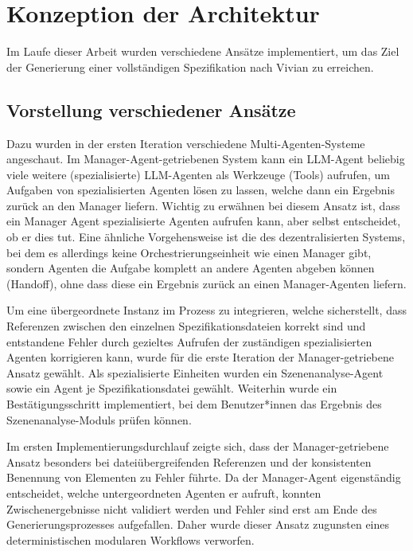 \section{Konzeption der Architektur}

Im Laufe dieser Arbeit wurden verschiedene Ansätze implementiert, um das Ziel der Generierung einer vollständigen Spezifikation nach Vivian zu erreichen.

\subsection{Vorstellung verschiedener Ansätze}

Dazu wurden in der ersten Iteration verschiedene Multi-Agenten-Systeme angeschaut. Im Manager-Agent-getriebenen System kann ein LLM-Agent beliebig viele weitere (spezialisierte) LLM-Agenten als Werkzeuge (Tools) aufrufen, um Aufgaben von spezialisierten Agenten lösen zu lassen, welche dann ein Ergebnis zurück an den Manager liefern. Wichtig zu erwähnen bei diesem Ansatz ist, dass ein Manager Agent spezialisierte Agenten aufrufen kann, aber selbst entscheidet, ob er dies tut. Eine ähnliche Vorgehensweise ist die des dezentralisierten Systems, bei dem es allerdings keine Orchestrierungseinheit wie einen Manager gibt, sondern Agenten die Aufgabe komplett an andere Agenten abgeben können (Handoff), ohne dass diese ein Ergebnis zurück an einen Manager-Agenten liefern.

Um eine übergeordnete Instanz im Prozess zu integrieren, welche sicherstellt, dass Referenzen zwischen den einzelnen Spezifikationsdateien korrekt sind und entstandene Fehler durch gezieltes Aufrufen der zuständigen spezialisierten Agenten korrigieren kann, wurde für die erste Iteration der Manager-getriebene Ansatz gewählt.
Als spezialisierte Einheiten wurden ein Szenenanalyse-Agent sowie ein Agent je Spezifikationsdatei gewählt. Weiterhin wurde ein Bestätigungsschritt implementiert, bei dem Benutzer*innen das Ergebnis des Szenenanalyse-Moduls prüfen können.

Im ersten Implementierungsdurchlauf zeigte sich, dass der Manager-getriebene Ansatz besonders bei dateiübergreifenden Referenzen und der konsistenten Benennung von Elementen zu Fehler führte.
Da der Manager-Agent eigenständig entscheidet, welche untergeordneten Agenten er aufruft, konnten Zwischenergebnisse nicht validiert werden und Fehler sind erst am Ende des Generierungsprozesses aufgefallen.
Daher wurde dieser Ansatz zugunsten eines deterministischen modularen Workflows verworfen.

